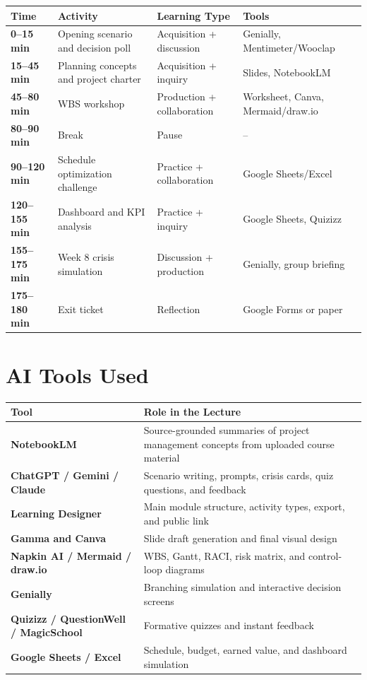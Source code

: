 \documentclass[11pt,a4paper]{article}
\begin{document}
\begin{longtable}{>{\bfseries}p{2.5cm}p{5.1cm}p{4cm}p{3cm}}
\textbf{Time} & \textbf{Activity} & \textbf{Learning Type} & \textbf{Tools} \\
\hline
0--15 min & Opening scenario and decision poll & Acquisition + discussion & Genially, Mentimeter/Wooclap \\
15--45 min & Planning concepts and project charter & Acquisition + inquiry & Slides, NotebookLM \\
45--80 min & WBS workshop & Production + collaboration & Worksheet, Canva, Mermaid/draw.io \\
80--90 min & Break & Pause & -- \\
90--120 min & Schedule optimization challenge & Practice + collaboration & Google Sheets/Excel \\
120--155 min & Dashboard and KPI analysis & Practice + inquiry & Google Sheets, Quizizz \\
155--175 min & Week 8 crisis simulation & Discussion + production & Genially, group briefing \\
175--180 min & Exit ticket & Reflection & Google Forms or paper \\
\end{longtable}

\section*{AI Tools Used}

\begin{longtable}{>{\bfseries}p{4.5cm}p{10cm}}
\textbf{Tool} & \textbf{Role in the Lecture} \\
\hline
NotebookLM & Source-grounded summaries of project management concepts from uploaded course material \\
ChatGPT / Gemini / Claude & Scenario writing, prompts, crisis cards, quiz questions, and feedback \\
Learning Designer & Main module structure, activity types, export, and public link \\
Gamma and Canva & Slide draft generation and final visual design \\
Napkin AI / Mermaid / draw.io & WBS, Gantt, RACI, risk matrix, and control-loop diagrams \\
Genially & Branching simulation and interactive decision screens \\
Quizizz / QuestionWell / MagicSchool & Formative quizzes and instant feedback \\
Google Sheets / Excel & Schedule, budget, earned value, and dashboard simulation \\
\end{longtable}
\end{document}
